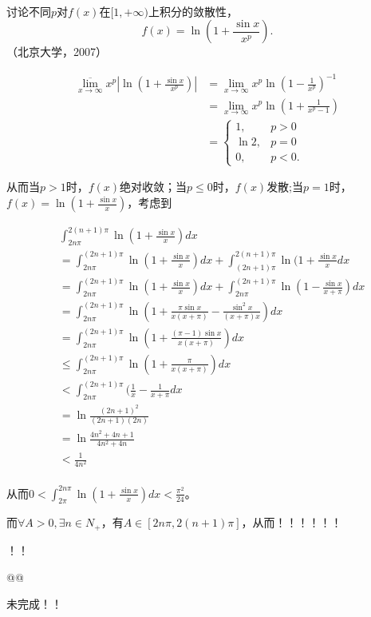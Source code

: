     \begin{example}
    \hfill\\
    讨论不同$p$对$f(x)$在$[1,+\infty)$上积分的敛散性，$$\displaystyle f(x)=\ln(1+\frac{\sin x}{x^p}).$$（北京大学，2007）
    
    
    \begin{align*}
  \overline{\lim_{x\rightarrow\infty}}x^p|\ln(1+\frac{\sin x}{x^p})|
  &=\lim_{x\rightarrow\infty}x^p\ln(1-\frac{1}{x^p})^{-1}\\
  &=\lim_{x\rightarrow\infty}x^p\ln(1+\frac{1}{x^p-1})\\
  &=\left\{\begin{array}{ll}1,&p>0\\\ln2,&p=0\\0,&p<0.\end{array}\right.  
  \end{align*}

  从而当$p>1$时，$f(x)$绝对收敛；当$p\leq0$时，$f(x)$发散;当$p=1$时，$f(x)=\ln(1+\frac{\sin x}{x})$，考虑到

  \begin{align*}
  &\int_{2n\pi}^{2(n+1)\pi}\ln(1+\frac{\sin x}{x})dx\\&=\int_{2n\pi}^{(2n+1)\pi}\ln(1+\frac{\sin x}{x})dx+\int_{(2n+1)\pi}^{2(n+1)\pi}\ln(1+\frac{\sin x}{x}dx\\
  &=\int_{2n\pi}^{(2n+1)\pi}\ln(1+\frac{\sin x}{x})dx+\int_{2n\pi}^{(2n+1)\pi}\ln(1-\frac{\sin x}{x+\pi})dx\\
  &=\int_{2n\pi}^{(2n+1)\pi}\ln(1+\frac{\pi\sin x}{x(x+\pi)}-\frac{\sin^2x}{(x+\pi)x})dx\\
  &=\int_{2n\pi}^{(2n+1)\pi}\ln(1+\frac{(\pi-1)\sin x}{x(x+\pi)})dx\\
  &\leq\int_{2n\pi}^{(2n+1)\pi}\ln(1+\frac{\pi}{x(x+\pi)})dx\\
  &<\int_{2n\pi}^{(2n+1)\pi}(\frac{1}{x}-\frac{1}{x+\pi}dx\\
  &=\ln\frac{(2n+1)^2}{(2n+1)(2n)}\\
  &=\ln\frac{4n^2+4n+1}{4n^2+4n}\\
  &<\frac{1}{4n^2}\\
  \end{align*}

  
  从而$0<\int_{2\pi}^{2n\pi}\ln(1+\frac{\sin x}{x})dx<\frac{\pi^2}{24}$。
  
  而$\forall A>0,\exists n\in N_+$，有$A\in[2n\pi,2(n+1)\pi]$，从而！！！！！！
  
  
  
  ！！
  
  @@
  
  未完成！！
    
    \end{example}  
\hfill\\
    
